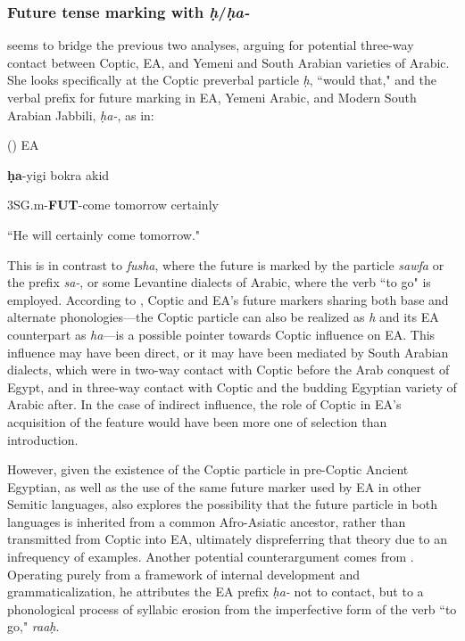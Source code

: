 \documentclass[12pt,a4paper]{article}
\newcounter{example}
\begin{document}
\subsubsection{Future tense marking with \textit{ḥ\textglotstop}/\textit{ḥa-}}
\label{subsubsec:future-tense-marking}

\textcite{abdelrahman_linguistic_2023} seems to bridge the previous two analyses, arguing for potential three-way contact between Coptic, EA, and Yemeni and South Arabian varieties of Arabic. She looks specifically at the Coptic preverbal particle \textit{ḥ\textglotstop}, ``would that," and the verbal prefix for future marking in EA, Yemeni Arabic, and Modern South Arabian Jabbili, \textit{ḥa-}, as in:

\vspace{3mm}
(\theexample) EA \parencite[75]{abdel-hafiz_development_2005}

\textbf{ḥa}-yigi bokra \textglotstop akid

3SG.m-\textbf{FUT}-come tomorrow certainly

``He will certainly come tomorrow."
\vspace{3mm}

This is in contrast to \textit{fusha}, where the future is marked by the particle \textit{sawfa} or the prefix \textit{sa-}, or some Levantine dialects of Arabic, where the verb ``to go" is employed. According to \textcite{abdelrahman_linguistic_2023}, Coptic and EA's future markers sharing both base and alternate phonologies---the Coptic particle can also be realized as \textit{h\textglotstop} and its EA counterpart as \textit{ha}---is a possible pointer towards Coptic influence on EA. This influence may have been direct, or it may have been mediated by South Arabian dialects, which were in two-way contact with Coptic before the Arab conquest of Egypt, and in three-way contact with Coptic and the budding Egyptian variety of Arabic after. In the case of indirect influence, the role of Coptic in EA's acquisition of the feature would have been more one of selection than introduction. 

However, given the existence of the Coptic particle in pre-Coptic Ancient Egyptian, as well as the use of the same future marker used by EA in other Semitic languages, \textcite{abdelrahman_linguistic_2023} also explores the possibility that the future particle in both languages is inherited from a common Afro-Asiatic ancestor, rather than transmitted from Coptic into EA, ultimately dispreferring that theory due to an infrequency of examples. Another potential counterargument comes from \textcite{abdel-hafiz_development_2005}. Operating purely from a framework of internal development and grammaticalization, he attributes the EA prefix \textit{ḥa-}
not to contact, but to a phonological process of syllabic erosion from the imperfective form of the verb ``to go," \textit{raaḥ}.
\end{document}
